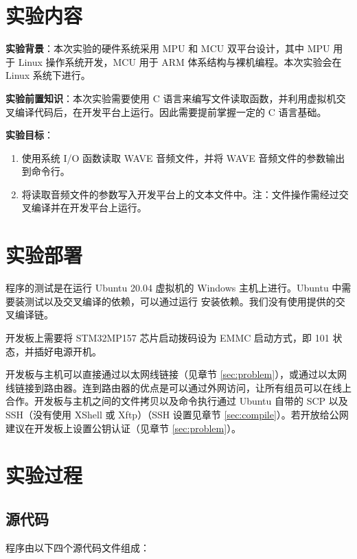 \section{实验内容}

\textbf{实验背景}：本次实验的硬件系统采用 MPU 和 MCU 双平台设计，其中 MPU 用于 Linux 操作系统开发，MCU 用于 ARM 体系结构与裸机编程。本次实验会在 Linux 系统下进行。

\textbf{实验前置知识}：本次实验需要使用 C 语言来编写文件读取函数，并利用虚拟机交叉编译代码后，在开发平台上运行。因此需要提前掌握一定的 C 语言基础。

\textbf{实验目标}：

\begin{enumerate}
    \item 使用系统 I/O 函数读取 WAVE  音频文件，并将 WAVE 音频文件的参数输出到命令行。
    \item 将读取音频文件的参数写入开发平台上的文本文件中。注：文件操作需经过交叉编译并在开发平台上运行。
\end{enumerate}

\section{实验部署}

程序的测试是在运行 Ubuntu 20.04 虚拟机的 Windows 主机上进行。Ubuntu 中需要装测试以及交叉编译的依赖，可以通过运行  安装依赖。我们没有使用提供的交叉编译链。

开发板上需要将 STM32MP157 芯片启动拨码设为 EMMC 启动方式，即 101 状态，并插好电源开机。

开发板与主机可以直接通过以太网线链接（见章节 \ref{sec:problem}），或通过以太网线链接到路由器。连到路由器的优点是可以通过外网访问，让所有组员可以在线上合作。开发板与主机之间的文件拷贝以及命令执行通过 Ubuntu 自带的 SCP 以及 SSH（没有使用 XShell 或 Xftp）（SSH 设置见章节 \ref{sec:compile}）。若开放给公网建议在开发板上设置公钥认证（见章节 \ref{sec:problem}）。

\section{实验过程}

\subsection{源代码}

程序由以下四个源代码文件组成：

